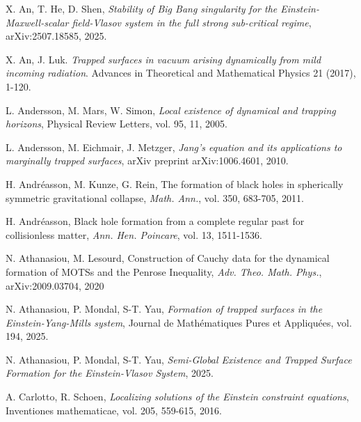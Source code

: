 \documentclass{amsart}
\begin{document}
{\begin{thebibliography}{}
 X. An, T. He, D. Shen, \textit{Stability of Big Bang singularity for the Einstein-Maxwell-scalar field-Vlasov system in the full strong sub-critical regime}, arXiv:2507.18585, 2025.  




 X. An, J. Luk. \textit{Trapped surfaces in vacuum arising dynamically from mild incoming radiation}. Advances in Theoretical and Mathematical Physics 21 (2017), 1-120.



 L. Andersson, M. Mars, W. Simon, \textit{Local existence of dynamical and trapping horizons}, Physical Review Letters, vol. 95, 11, 2005. 


 L. Andersson, M. Eichmair, J. Metzger, \textit{Jang's equation and its applications to marginally trapped surfaces}, arXiv preprint arXiv:1006.4601, 2010.  








 H. Andr{\'e}asson, M. Kunze, G. Rein, The formation of black holes in spherically symmetric gravitational collapse, \textit{Math. Ann.}, vol. 350, 683-705, 2011.   


 H. Andr{\'e}asson, Black hole formation from a complete regular past for collisionless matter, \textit{Ann. Hen. Poincare}, vol. 13, 1511-1536. 





 N. Athanasiou, M. Lesourd, Construction of Cauchy data for the dynamical formation of MOTSs and the Penrose Inequality, \textit{Adv. Theo. Math. Phys.}, arXiv:2009.03704, 2020   





 N. Athanasiou, P. Mondal, S-T. Yau, \textit{Formation of trapped surfaces in the Einstein-Yang-Mills system}, Journal de Math{\'e}matiques Pures et Appliqu{\'e}es, vol. 194, 2025.  

 N. Athanasiou, P. Mondal, S-T. Yau, \textit{Semi-Global Existence and Trapped Surface Formation for the Einstein-Vlasov System}, 2025.  

 A. Carlotto, R. Schoen, \textit{Localizing solutions of the Einstein constraint equations},  Inventiones mathematicae, vol. 205, 559-615, 2016. 







\end{thebibliography}}
\end{document}
